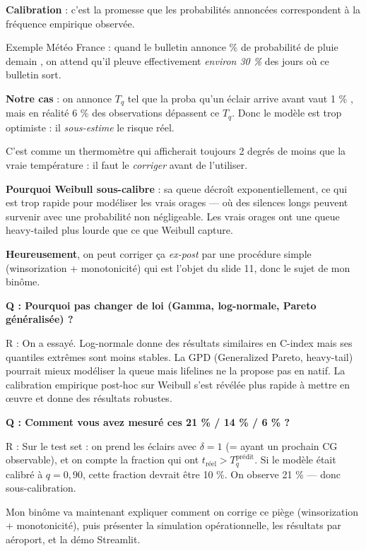 \documentclass[11pt,a4paper]{article}
\begin{document}
\begin{compr}
\textbf{Calibration} : c'est la promesse que les probabilités annoncées correspondent à
la fréquence empirique observée.

Exemple Météo France : quand le bulletin annonce  \% de probabilité de pluie demain \fg{},
on attend qu'il pleuve effectivement \emph{environ 30 \%} des jours où ce bulletin sort.

\textbf{Notre cas} : on annonce \og $T_q$ tel que la proba qu'un éclair arrive avant
vaut 1 \% \fg{}, mais en réalité 6 \% des observations dépassent ce $T_q$. Donc le modèle
est trop optimiste : il \emph{sous-estime} le risque réel.

C'est comme un thermomètre qui afficherait toujours 2 degrés de moins que la vraie
température : il faut le \emph{corriger} avant de l'utiliser.

\textbf{Pourquoi Weibull sous-calibre} : sa queue décroît exponentiellement, ce qui est
trop rapide pour modéliser les vrais orages — où des silences longs peuvent survenir
avec une probabilité non négligeable. Les vrais orages ont une queue \og heavy-tailed \fg{}
plus lourde que ce que Weibull capture.

\textbf{Heureusement}, on peut corriger ça \emph{ex-post} par une procédure simple
(winsorization + monotonicité) qui est l'objet du slide 11, donc le sujet de mon binôme.
\end{compr}

\begin{piege}
\textbf{Q : Pourquoi pas changer de loi (Gamma, log-normale, Pareto généralisée) ?}

R : On a essayé. Log-normale donne des résultats similaires en C-index mais ses
quantiles extrêmes sont moins stables. La GPD (Generalized Pareto, heavy-tail) pourrait
mieux modéliser la queue mais lifelines ne la propose pas en natif. La calibration
empirique post-hoc sur Weibull s'est révélée plus rapide à mettre en œuvre et donne
des résultats robustes.

\textbf{Q : Comment vous avez mesuré ces 21 \% / 14 \% / 6 \% ?}

R : Sur le test set : on prend les éclairs avec $\delta = 1$ (= ayant un prochain CG
observable), et on compte la fraction qui ont $t_{\text{réel}} > T_q^{\text{prédit}}$.
Si le modèle était calibré à $q = 0{,}90$, cette fraction devrait être 10 \%. On observe
21 \% — donc sous-calibration.
\end{piege}

\begin{transit}
\og Mon binôme va maintenant expliquer comment on corrige ce piège (winsorization +
monotonicité), puis présenter la simulation opérationnelle, les résultats par aéroport,
et la démo Streamlit. \fg{}
\end{transit}
\end{document}
